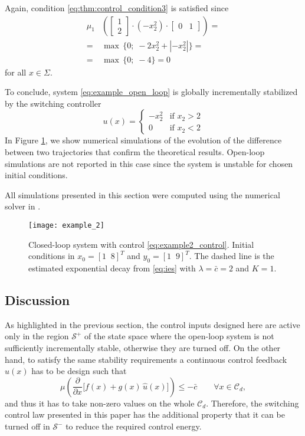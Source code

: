 \documentclass[letterpaper, 10 pt, conference]{ieeeconf}
\begin{document}
Again, condition \eqref{eq:thm:control_condition3} is satisfied since
\begin{equation*}
\begin{split}
\mu_1&\left(
\begin{bmatrix}
1\\
2
\end{bmatrix}
\cdot (-x_2^2) \cdot
\begin{bmatrix}
0 & 1
\end{bmatrix} \right)=\\
=& \max\,\{ 0;\; -2x_2^2+|-x_2^2|\}=\\
=& \max\,\{ 0;\; -4\}=0
\end{split}
\end{equation*}
for all $x\in\Sigma$.

To conclude, system \eqref{eq:example_open_loop} is globally incrementally stabilized by the switching controller
\begin{equation}
\label{eq:example2_control}
u(x)=
\begin{cases}
-x_2^2 & \mbox{if } x_2>2\\
0 & \mbox{if } x_2<2
\end{cases}
\end{equation}
In Figure \ref{fig:example2_sim}, we show numerical simulations of the evolution of the difference between two trajectories that confirm the theoretical results. Open-loop simulations are not reported in this case since the system is unstable for chosen initial conditions.

All simulations presented in this section were computed using the numerical solver in \cite{piiroinen2008event}.
\begin{figure}[t]
\centering 
{\texttt{[image: example\_2]}}
\caption{Closed-loop system with control \eqref{eq:example2_control}. Initial conditions in $x_0=[1\;\;8]^T$ and $y_0=[1\;\;9]^T$. The dashed line is the estimated exponential decay from \eqref{eq:ies} with $\lambda=\bar{c}=2$ and $K=1$.} 
\label{fig:example2_sim}
\end{figure}



\subsection{Discussion}
As highlighted in the previous section, the control inputs designed here are active only in the region $\mathcal{S}^+$ of the state space where the open-loop system is not sufficiently incrementally stable, otherwise they are turned off. On the other hand, to satisfy the same stability requirements a continuous control feedback $\widehat{u}(x)$ has to be design such that
\begin{equation*}
\mu \left(\frac{\partial}{\partial x}\big[ f(x)+g(x)\,\widehat{u}(x) \big] \right)\leq -\bar{c} \qquad \forall x\in\mathcal{C}_d,
\end{equation*}
and thus it has to take non-zero values on the whole $\mathcal{C}_d$.
Therefore, the switching control law presented in this paper has the additional property that it can be turned off in $\mathcal{S}^-$ to reduce the required control energy.
\end{document}
